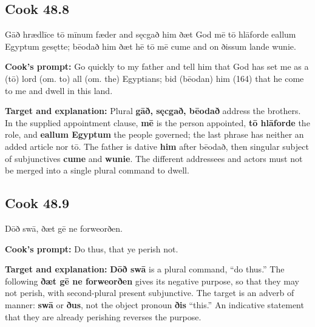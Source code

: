 \par\begin{minipage}{\linewidth}\raggedright
\subsection*{Cook 48.8}

Gāð hrædlīce tō mīnum fæder and sęcgað him ðæt God mē tō hlāforde eallum Egyptum gesętte; bēodað him ðæt hē tō mē cume and on ðissum lande wunie.

\textbf{Cook’s prompt:} Go quickly to my father and tell him that God has set me as a (tō) lord (om. to) all (om. the) Egyptians; bid (bēodan) him (164) that he come to me and dwell in this land.

\textbf{Target and explanation:} Plural \textbf{gāð, sęcgað, bēodað} address the brothers. In the supplied appointment clause, \textbf{mē} is the person appointed, \textbf{tō hlāforde} the role, and \textbf{eallum Egyptum} the people governed; the last phrase has neither an added article nor tō. The father is dative \textbf{him} after bēodað, then singular subject of subjunctives \textbf{cume} and \textbf{wunie}. The different addressees and actors must not be merged into a single plural command to dwell.

\end{minipage}\par\addvspace{4pt}

\par\begin{minipage}{\linewidth}\raggedright
\subsection*{Cook 48.9}

Dōð swā, ðæt gē ne forweorðen.

\textbf{Cook’s prompt:} Do thus, that ye perish not.

\textbf{Target and explanation:} \textbf{Dōð swā} is a plural command, “do thus.” The following \textbf{ðæt gē ne forweorðen} gives its negative purpose, so that they may not perish, with second-plural present subjunctive. The target is an adverb of manner: \textbf{swā} or \textbf{ðus}, not the object pronoun \textbf{ðis} “this.” An indicative statement that they are already perishing reverses the purpose.

\end{minipage}\par\addvspace{4pt}

